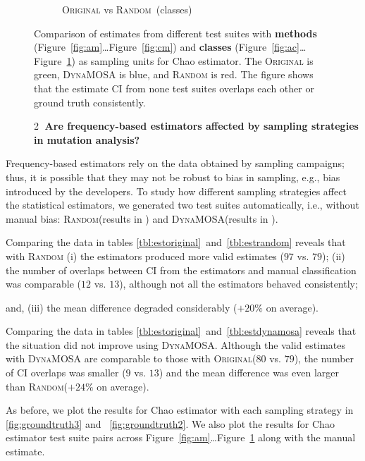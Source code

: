 \documentclass[sigconf]{acmart}
\newcommand{\Chao}{Chao\xspace}
\newcommand{\original}{\textsc{Original}\xspace}
\newcommand{\EvosuiteRandom}{\textsc{Random}\xspace}
\newcommand{\EvosuiteDynamosa}{\textsc{DynaMOSA}\xspace}
\newcommand{\RQBx}{%
\begin{description}\item[] \textcircled{2} \textbf{Are frequency-based estimators affected by sampling strategies in mutation analysis?}\end{description}}
\newcommand{\todo}[1]{}
\begin{document}
\begin{figure}
\begin{subfigure}{.28\textwidth}
  \caption{\textcolor{coriginal}\original vs \textcolor{crandom}\EvosuiteRandom~(classes)}
\label{fig:cc}
\end{subfigure}
  \caption{Comparison of estimates from different test suites with \textbf{methods} (Figure~\ref{fig:am}\ldots Figure~\ref{fig:cm}) and \textbf{classes} (Figure~\ref{fig:ac}\ldots Figure~\ref{fig:cc}) as sampling units for \Chao estimator.
  The \original is \textcolor{coriginal}{green}, 
  \EvosuiteDynamosa is \textcolor{cdynamosa}{blue},
  and \EvosuiteRandom is \textcolor{crandom}{red}. The figure shows that the estimate CI from none test suites overlaps each other or ground truth consistently.}
\label{fig:classsamplingunit}
\end{figure}

\RQBx
Frequency-based estimators rely on the data obtained by sampling campaigns;
thus, it is possible that they %
may not be robust to bias in sampling, e.g., bias introduced by the developers.
To study how different sampling strategies affect the statistical estimators,
we generated two test suites automatically, i.e., without manual bias:
\EvosuiteRandom (results in ) and \EvosuiteDynamosa (results in ).



Comparing the data in tables \ref{tbl:estoriginal}~and~\ref{tbl:estrandom}
reveals that with \EvosuiteRandom
(i) the estimators produced more valid estimates ($97$ vs. $79$);
(ii) the number of overlaps between CI from the estimators and manual classification
was comparable ($12$ vs. $13$), although not all the estimators behaved consistently;
\todo{ALESSIO: some lost, some gain, the majority stayed the same}
and, (iii) the mean difference degraded considerably ($+20\%$ on average).


Comparing the data in tables \ref{tbl:estoriginal}~and~\ref{tbl:estdynamosa}
reveals that the situation did not improve using \EvosuiteDynamosa.
Although the valid estimates with \EvosuiteDynamosa are comparable to those with \original ($80$ vs. $79$),
the number of CI overlaps was smaller ($9$ vs. $13$) and the mean difference was even larger than \EvosuiteRandom ($+24\%$ on average).

As before, we plot the results for \Chao estimator with each sampling strategy %
in \ref{fig:groundtruth3} and ~\ref{fig:groundtruth2}.
We also plot the results for \Chao estimator test suite pairs across Figure~\ref{fig:am}\ldots Figure~\ref{fig:cc} along with the manual estimate.
\end{document}
